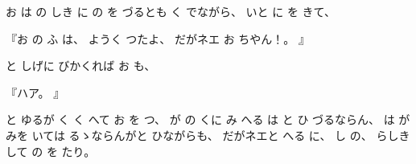
お
は
の
しき
に
の
を
づるとも
く
でながら、
%
いと
に
を
きて、

『お
の
ふ
は、
%
ようく
つたよ、
%
だがネエ
お
ちやん！。
』

と
しげに
びかくれば
お
も、

『ハア。
』

と
ゆるが
く
く
へて
お
を
つ、
%
が
の
くに
み
へる
は
と
ひ
づるならん、
%
は
が
みを
いては
るゝならんがと
ひながらも、
%
だがネエと
へる
に、
%
し
の、
%
らしき
して
の
を
たり。

